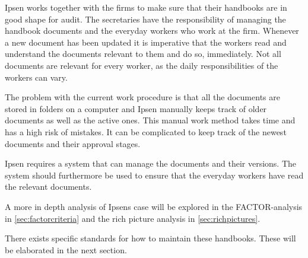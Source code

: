 Ipsen works together with the firms to make sure that their handbooks are in good shape for audit.
The secretaries have the responsibility of managing the handbook documents and the everyday workers who work at the firm.
Whenever a new document has been updated it is imperative that the workers read and understand the documents relevant to them and do so, immediately.
Not all documents are relevant for every worker, as the daily responsibilities of the workers can vary.

The problem with the current work procedure is that all the documents are stored in folders on a computer and Ipsen manually keeps track of older documents as well as the active ones.
This manual work method takes time and has a high risk of mistakes.
It can be complicated to keep track of the newest documents and their approval stages.

Ipsen requires a system that can manage the documents and their versions.
The system should furthermore be used to ensure that the everyday workers have read the relevant documents.

A more in depth analysis of Ipsens case will be explored in the FACTOR-analysis in \cref{sec:factorcriteria} and the rich picture analysis in \cref{sec:richpictures}.

There exists specific standards for how to maintain these handbooks.
These will be elaborated in the next section.
